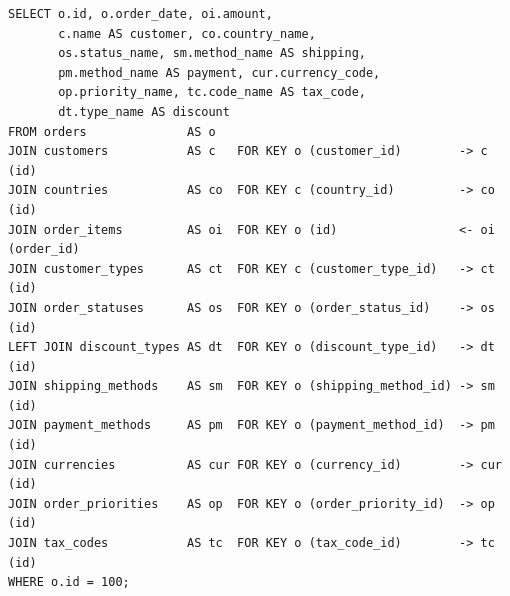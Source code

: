 \documentclass[12pt]{article}
\newcommand{\FanoutCheckHeight}[3]{%
  \ifdim\dimexpr\ht#1+\dp#1\relax>#2\relax
    \PackageError{fanout-layout}{#3 exceeds its vertical allocation}%
      {Adjust the terminal line spacing or the box position.}%
  \fi
}
\begin{document}
\newsavebox{\canonicalStageTen}
\begin{lrbox}{\canonicalStageTen}\begin{minipage}{344mm}
\begin{NoHyper}
\begin{lstlisting}[style=complex-sql]
SELECT o.id, o.order_date, oi.amount,
       c.name AS customer, co.country_name,
       os.status_name, sm.method_name AS shipping,
       pm.method_name AS payment, cur.currency_code,
       op.priority_name, tc.code_name AS tax_code,
       dt.type_name AS discount
FROM orders              AS o
JOIN customers           AS c   FOR KEY o (customer_id)        -> c (id)
JOIN countries           AS co  FOR KEY c (country_id)         -> co (id)
JOIN order_items         AS oi  FOR KEY o (id)                 <- oi (order_id)
JOIN customer_types      AS ct  FOR KEY c (customer_type_id)   -> ct (id)
JOIN order_statuses      AS os  FOR KEY o (order_status_id)    -> os (id)
LEFT JOIN discount_types AS dt  FOR KEY o (discount_type_id)   -> dt (id)
JOIN shipping_methods    AS sm  FOR KEY o (shipping_method_id) -> sm (id)
JOIN payment_methods     AS pm  FOR KEY o (payment_method_id)  -> pm (id)
JOIN currencies          AS cur FOR KEY o (currency_id)        -> cur (id)
JOIN order_priorities    AS op  FOR KEY o (order_priority_id)  -> op (id)
JOIN tax_codes           AS tc  FOR KEY o (tax_code_id)        -> tc (id)
WHERE o.id = 100;
\end{lstlisting}
\end{NoHyper}
\end{minipage}\end{lrbox}
\FanoutCheckHeight{\canonicalStageTen}{122mm}{Canonical-form state 10}
\end{document}
